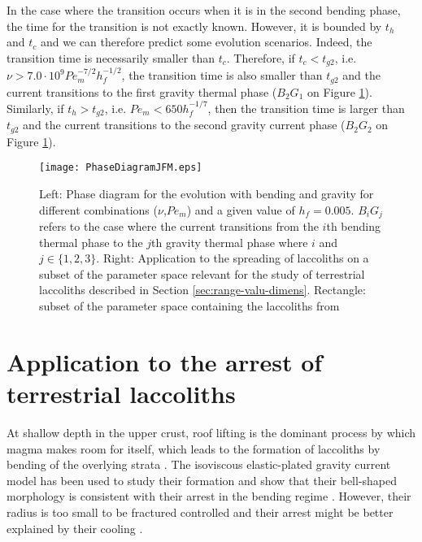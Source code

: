 In  the case  where the  transition occurs  when it  is in  the second
bending  phase, the  time for  the  transition is  not exactly  known.
However, it is bounded by $t_h$ and $t_c$ and we can therefore predict
some evolution scenarios.  Indeed,  the transition time is necessarily
smaller    than    $t_c$.     Therefore,   if    $t_c<t_{g2}$,    i.e.
$\nu>7.0\cdot 10^9Pe_m^{-7/2} h_f^{-1/2}$, the transition time is also
smaller than $t_{g2}$ and the current transitions to the first gravity
thermal  phase  ($B_2G_1$   on  Figure  \ref{Phase_Diagram_ELASGRAV}).
Similarly,  if  $t_h>t_{g2}$,  i.e.   $Pe_m<650h_f^{-1/7}$,  then  the
transition time is larger than $t_{g2}$ and the current transitions to
the    second   gravity    current   phase    ($B_2G_2$   on    Figure
\ref{Phase_Diagram_ELASGRAV}).

\begin{figure}
  \begin{center}
    \graphicspath{ {/Users/thorey/Documents/These/Projet/Refroidissement/Skin_Model/Figure/JFM_V13/} }
    \texttt{[image: PhaseDiagramJFM.eps]}
    \caption{Left: Phase  diagram for  the evolution with  bending and
      gravity for  different combinations  ($\nu$,$Pe_m$) and  a given
      value of $h_f  = 0.005$.  $B_iG_j$ refers to the  case where the
      current transitions from the $i$th  bending thermal phase to the
      $j$th gravity  thermal phase  where $i$  and $j  \in \{1,2,3\}$.
      Right: Application to the spreading of laccoliths on a subset of
      the  parameter  space  relevant  for the  study  of  terrestrial
      laccoliths  described  in  Section  \ref{sec:range-valu-dimens}.
      Rectangle:  subset   of  the  parameter  space   containing  the
      laccoliths from \citet{Rocchi:2002jy}}
    \label{Phase_Diagram_ELASGRAV}
  \end{center}
\end{figure}

\section{Application to the arrest of terrestrial laccoliths}
\label{sec:appl-arrest-terr}

At shallow  depth in  the upper  crust, roof  lifting is  the dominant
process  by which  magma makes  room for  itself, which  leads to  the
formation   of  laccoliths   by  bending   of  the   overlying  strata
\citep{Johnson:1973ho,Pollard:1973ho}.  The  isoviscous elastic-plated
gravity current model has been used  to study their formation and show
that their bell-shaped  morphology is consistent with  their arrest in
the  bending  regime  \citep{Michaut:2011kg,Bunger:2011cb}.   However,
their radius is too small to  be fractured controlled and their arrest
might be better explained by their cooling \citep{Michaut:2011kg}.

